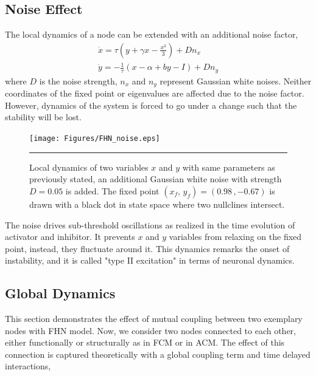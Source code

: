 \subsection{Noise Effect}

The local dynamics of a node can be extended with an additional noise factor, 
\begin{subequations}
\begin{align}\dot{x} = \tau (y + \gamma x - \frac{x^3}{3}) + Dn_x  \label{eqn: frobenius 12}\\  \dot{y} = -\frac{1}{\tau} (x - \alpha + b y - I ) + Dn_y \label{eqn: frobenius 13}   \end{align} 
\end{subequations}
where $D$ is the noise strength, $n_x$ and $n_y$ represent Gaussian white noises. Neither coordinates of the fixed point or eigenvalues are affected due to the noise factor. However, dynamics of the system is forced to go under a change such that the stability will be lost. 

\begin{figure}[htbp]
  \centering
	\texttt{[image: Figures/FHN\_noise.eps]}
 
    \rule{35em}{0.5pt}
    \caption[FHN Noise]{Local dynamics of two variables $x$ and  $y$ with same parameters as previously stated, an additional Gaussian white noise with strength $D=0.05$ is added. The fixed point $(x_f, \, y_f) = (0.98 \, , -0.67 )$ is drawn with a black dot in state space where two nullclines intersect.   }
  \label{fig:FHN Noise}	
\end{figure}

The noise drives sub-threshold oscillations as realized in the time evolution of activator and inhibitor. It prevents $x$ and $y$ variables from relaxing on the fixed point, instead, they fluctuate around it. This dynamics remarks the onset of instability, and it is called "type II excitation" in terms of neuronal dynamics. 


\subsection{Global Dynamics}

This section demonstrates the effect of mutual coupling between two exemplary nodes with FHN model. Now, we consider two nodes connected to each other, either functionally or structurally as in FCM or in ACM. The effect of this connection is captured theoretically with a global coupling term and time delayed interactions, 

